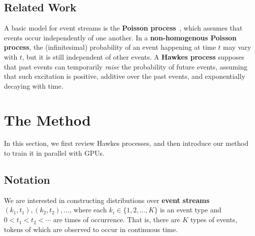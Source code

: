 \documentclass{article}
\newcommand{\circone}{\ding{172}\xspace}
\newcommand{\circtwo}{\ding{173}\xspace}
\newcommand{\circthree}{\ding{174}\xspace}
\newcommand{\defn}[1]{\textbf{#1}}   %
\begin{document}
\subsection{Related Work}
A basic model for event streams is the \defn{Poisson process}~\citep{palm-43}, which assumes that events occur independently of one another.  In a \defn{non-homogenous Poisson process}, the (infinitesimal) probability of an event happening at time $t$ may vary with $t$, but it is still independent of other events.  A \defn{Hawkes process} \citep{hawkes-71,liniger-09-hawkes}
supposes that past events can temporarily {\em raise} the probability of future events, assuming that such excitation is \circone positive, \circtwo additive over the past events, and \circthree exponentially decaying with time.

\section{The Method}
\label{sec:method}
In this section, we first review Hawkes processes, and then introduce our method to train it in parallel with GPUs.

\subsection{Notation}
We are interested in constructing distributions over \defn{event streams} $(k_1,t_1), (k_2, t_2), \ldots$, where each $k_i \in \{1,2,\ldots,K\}$ is an event type and $0 < t_1 < t_2 < \cdots$ are times of occurrence. That is, there are $K$ types of events, tokens of which are observed to occur in continuous time.
\end{document}
